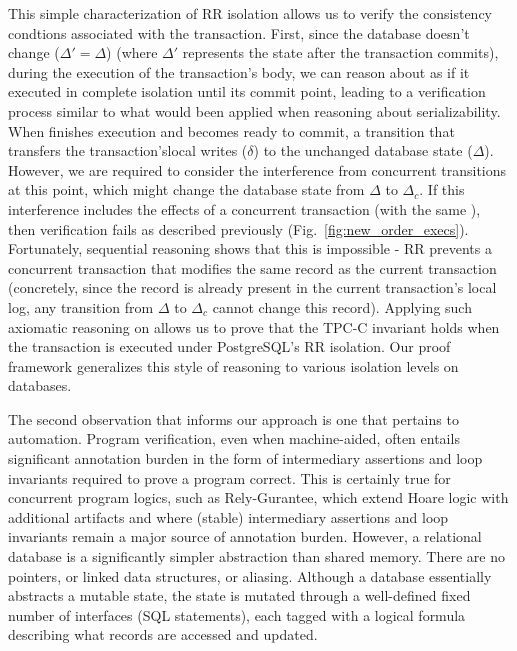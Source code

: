 This simple characterization of RR isolation allows us to verify the
consistency condtions associated with the 
transaction. First, since the database doesn't change ($\Delta' =
\Delta$) (where $\Delta'$ represents the state after the transaction
commits), during the execution of the transaction's body, we can
reason about  as if it executed in complete isolation
until its commit point, leading to a verification process similar to
what would been applied when reasoning about serializability.  When
 finishes execution and becomes ready to commit, a
transition that transfers the transaction'slocal writes ($\delta$) to
the unchanged database state ($\Delta$).  However, we are required to
consider the interference from concurrent transitions at this point,
which might change the database state from $\Delta$ to $\Delta_c$. If
this interference includes the effects of a concurrent 
transaction (with the same ), then verification fails as
described previously (Fig.~\ref{fig:new_order_execs}). Fortunately,
sequential reasoning shows that this is impossible - RR prevents a
concurrent  transaction that modifies the same
 record as the current transaction (concretely, since the
record is already present in the current transaction's local log, any
transition from $\Delta$ to $\Delta_c$ cannot change this record).
Applying such axiomatic reasoning on  allows us to prove
that the TPC-C invariant holds when the transaction is executed under
PostgreSQL's RR isolation.  Our proof framework generalizes this style
of reasoning to various isolation levels on databases.

The second observation that informs our approach is one that pertains
to automation. Program verification, even when machine-aided, often
entails significant annotation burden in the form of intermediary
assertions and loop invariants required to prove a program correct.
This is certainly true for concurrent program logics, such as
Rely-Gurantee, which extend Hoare logic with additional artifacts and
where (stable) intermediary assertions and loop invariants remain a
major source of annotation burden.  However, a relational database is
a significantly simpler abstraction than shared memory. There are no
pointers, or linked data structures, or aliasing.  Although a database
essentially abstracts a mutable state, the state is mutated through a
well-defined fixed number of interfaces (SQL statements), each tagged
with a logical formula describing what records are accessed and
updated. 

